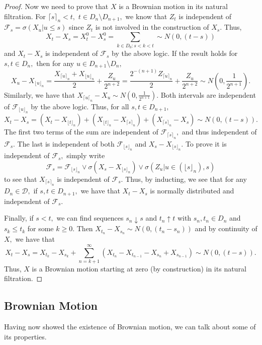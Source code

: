 \documentclass[openany, amssymb, psamsfonts]{amsart}
\theoremstyle{definition}
\numberwithin{equation}{section}
\newcommand{\sm}{\setminus}
\begin{document}
\begin{proof}
Now we need to prove that $X$ is a Brownian motion in its natural filtration. For $\lceil s\rceil_n <t,$ $t\in D_n \sm D_{n+1},$ we know that $Z_t$ is independent of $\mathcal{F}_s = \sigma(X_u | u\leq s)$ since $Z_t$ is not involved in the construction of $X_s.$ Thus,
\[X_t - X_s  = X_t^0 - X_s^0 = \sum_{k\in D_0: s<k<t} \sim N(0,(t-s))\] and $X_t - X_s$ is independent of $\mathcal{F}_s$ by the above logic. If the result holds for $s,t \in D_n,$ then for any $u\in D_{n+1}\sm D_n,$
\[X_u - X_{\lfloor u\rfloor_n} = \frac{X_{\lceil u \rceil_n}+ X_{\lfloor u \rfloor_n}}{2} + \frac{Z_u}{2^{n+2}} = \frac{2^{-(n+1)}Z_{\lceil u\rceil_n}}{2} + \frac{Z_u}{2^{n+2}}\sim N(0,\frac{1}{2^{n+1}}).\] Similarly, we have that $X_{\lceil u \lceil_n} - X_u\sim N(0,\frac{1}{2^{n+1}}).$ Both intervals are independent of $\mathcal{F}_{\lfloor u\rfloor_n}$ by the above logic. Thus, for all $s,t \in D_{n+1},$
\[X_t - X_s = (X_t - X_{\lfloor t\rfloor_n}) + (X_{\lfloor t\rfloor_n} - X_{\lceil s\rceil_n}) + (X_{\lceil s\rceil_n} - X_s)\sim N(0,(t-s)).\] The first two terms of the sum are independent of $\mathcal{F}_{\lceil s\rceil_n},$ and thus independent of $\mathcal{F}_s.$ The last is independent of both $\mathcal{F}_{\lfloor s\rfloor_n}$ and 
$X_{s} - X_{\lfloor s \rfloor_n}.$ To prove it is independent of $\mathcal{F}_s,$ simply write 
\[\mathcal{F}_s = \mathcal{F}_{\lfloor s\rfloor_n}\vee \sigma(X_s - X_{\lfloor s\rfloor_n}) \vee \sigma(Z_u | u \in (\lfloor s\rfloor_n), s)\] to see that $X_{\lceil s\rceil_n}$ is independent of $\mathcal{F}_s.$ Thus, by inducting, we see that for any $D_n \in \mathcal{D},$ if $s,t \in D_{n+1},$ we have that $X_t - X_s$ is normally distributed and independent of $\mathcal{F}_s.$

Finally, if $s<t,$ we can find sequences $s_n \downarrow s$ and $t_n \uparrow t$ with $s_n, t_n \in D_n$ and $s_k \leq t_k$ for some $k\geq 0.$ Then $X_{t_n} - X_{s_n} \sim N(0, (t_n - s_n))$ and by continuity of $X,$ we have that
\[X_t - X_s = X_{t_k} - X_{s_k} + \sum_{n = k+1}^\infty (X_{t_n} - X_{t_{n-1}} - X_{s_n} + X_{s_{n-1}})\sim N(0,(t-s)).\] Thus, $X$ is a Brownian motion starting at zero (by construction) in its natural filtration.
\end{proof}

\subsection{Brownian Motion}
Having now showed the existence of Brownian motion, we can talk about some of its properties.
\end{document}
